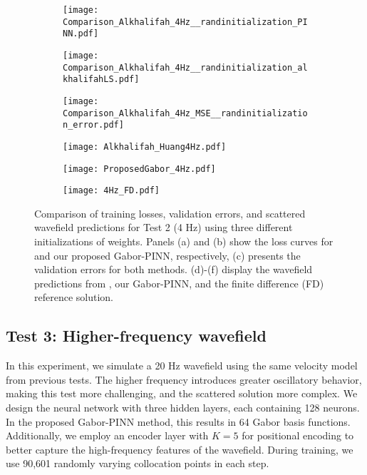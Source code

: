 \documentclass[authoryear, preprint, 12pt]{elsarticle}
\begin{document}
	\begin{figure}[h]
		\centering
		\begin{subfigure}[b]{0.32\textwidth}
			\texttt{[image: Comparison\_Alkhalifah\_4Hz\_\_randinitialization\_PINN.pdf]}
		\end{subfigure}
		\begin{subfigure}[b]{0.32\textwidth}
			\texttt{[image: Comparison\_Alkhalifah\_4Hz\_\_randinitialization\_alkhalifahLS.pdf]}
		\end{subfigure}
		\begin{subfigure}[b]{0.32\textwidth}
			\texttt{[image: Comparison\_Alkhalifah\_4Hz\_MSE\_\_randinitialization\_error.pdf]}
		\end{subfigure}
		
		\begin{subfigure}[b]{0.32\textwidth}
			\texttt{[image: Alkhalifah\_Huang4Hz.pdf]}
		\end{subfigure}
		\begin{subfigure}[b]{0.32\textwidth}
			\texttt{[image: ProposedGabor\_4Hz.pdf]}
		\end{subfigure}
		\begin{subfigure}[b]{0.32\textwidth}
			\texttt{[image: 4Hz\_FD.pdf]}
		\end{subfigure}
		
\caption{Comparison of training losses, validation errors, and scattered wavefield predictions for Test 2 (4 Hz) using three different initializations of weights. Panels (a) and (b) show the loss curves for \cite{Alkhalifah2024} and our proposed Gabor-PINN, respectively, (c) presents the validation errors for both methods. (d)-(f) display the wavefield predictions from \cite{Alkhalifah2024}, our Gabor-PINN, and the finite difference (FD) reference solution.}
\label{fig:4Hz_test}

	\end{figure}
	
\subsection{Test 3:  Higher-frequency wavefield}

In this experiment, we simulate a 20 Hz wavefield using the same velocity model from previous tests. The higher frequency introduces greater oscillatory behavior, making this test more challenging, and the scattered solution more complex. We design the neural network with three hidden layers, each containing 128 neurons. In the proposed Gabor-PINN method, this results in 64 Gabor basis functions. Additionally, we employ an encoder layer with \( K = 5 \) for positional encoding to better capture the high-frequency features of the wavefield. During training, we use 90,601 randomly varying collocation points in each step.
\end{document}
